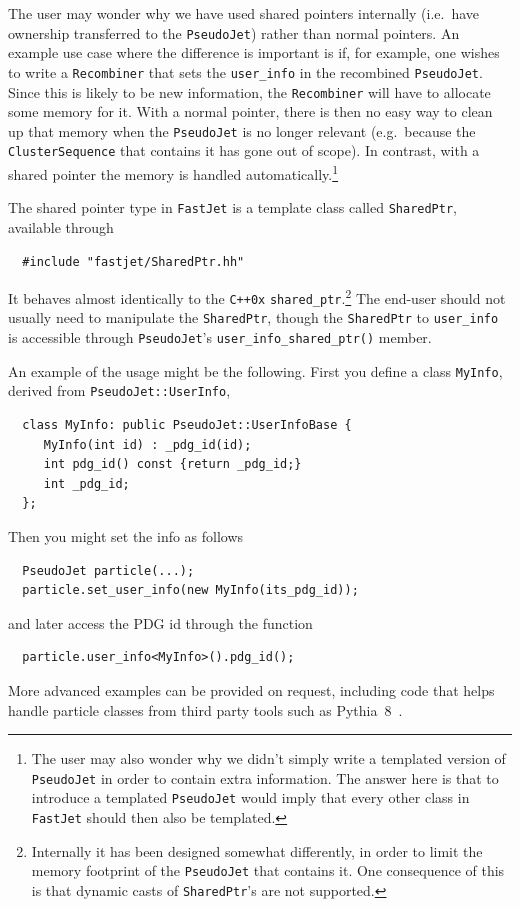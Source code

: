 \documentclass[12pt,a4]{article}
\newcommand{\fastjet}{\texttt{FastJet}\xspace}
\newcommand{\ttt}[1]{{\small\texttt{#1}}}
\newcommand{\PJ}{\ttt{PseudoJet}\xspace}
\newcommand{\CS}{\ttt{ClusterSequence}\xspace}
\begin{document}
The user may wonder why we have used shared pointers internally (i.e.\
have ownership transferred to the \ttt{PseudoJet}) rather than normal
pointers.
%
An example use case where the difference is important is if, for
example, one wishes to write a \ttt{Recombiner} that sets the
\ttt{user\_info} in the recombined \PJ.
%
Since this is likely to be new information, the \ttt{Recombiner} will
have to allocate some memory for it. 
%
With a normal pointer, there is then no easy way to clean up that
memory when the \PJ is no longer relevant (e.g.\ because the \CS that
contains it has gone out of scope). 
%
In contrast, with a shared pointer the memory is handled automatically.\footnote{
  The user may also wonder why we didn't simply write a templated
  version of \PJ in order to contain extra information.
  The answer here is that to introduce a templated \PJ would imply
  that every other class in \fastjet should then also be templated. 
}

The shared pointer type in \fastjet is a template class called
\ttt{SharedPtr}, available through 
%
\begin{lstlisting}
  #include "fastjet/SharedPtr.hh"
\end{lstlisting}
%
It behaves almost identically to the \ttt{C++0x} \ttt{shared\_ptr}.\footnote{
%
Internally it has been designed somewhat differently, in order
to limit the memory footprint of the \PJ that contains it. One
consequence of this is that dynamic casts of \ttt{SharedPtr}'s are not
supported.}
%
The end-user should not usually need to manipulate the
\ttt{SharedPtr}, though the \ttt{SharedPtr} to \ttt{user\_info} is
accessible through \PJ's \ttt{user\_info\_shared\_ptr()} member.

An example of the usage might be the following. First you define a
class \ttt{MyInfo}, derived from \ttt{PseudoJet::UserInfo},
\begin{lstlisting}
  class MyInfo: public PseudoJet::UserInfoBase {
     MyInfo(int id) : _pdg_id(id);
     int pdg_id() const {return _pdg_id;}
     int _pdg_id;
  };
\end{lstlisting}
Then you might set the info as follows
\begin{lstlisting}
  PseudoJet particle(...);
  particle.set_user_info(new MyInfo(its_pdg_id));
\end{lstlisting}
and later access the PDG id through the function
\begin{lstlisting}
  particle.user_info<MyInfo>().pdg_id();
\end{lstlisting}
More advanced examples can be provided on request, including code that
helps handle particle classes from third party tools such as
Pythia~8~\cite{Sjostrand:2007gs}.
\end{document}
